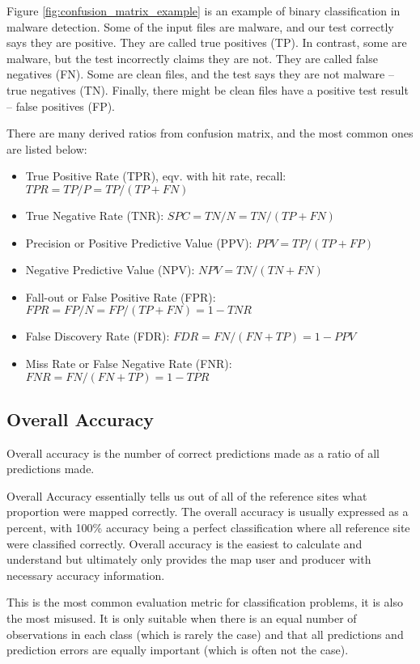 Figure \ref{fig:confusion_matrix_example} is an example of binary classification in malware detection. Some of the input files are malware, and our test correctly says they are positive. They are called true positives (TP). In contrast, some are malware, but the test incorrectly claims they are not. They are called false negatives (FN). Some are clean files, and the test says they are not malware – true negatives (TN). Finally, there might be clean files have a positive test result – false positives (FP).

There are many derived ratios from confusion matrix, and the most common ones are listed below:

\begin{itemize}
    \item True Positive Rate (TPR), eqv. with hit rate, recall: $TPR = TP/P = TP/(TP + FN)$
    \item True Negative Rate (TNR): $SPC = TN/N = TN/(TP + FN)$
    \item Precision or Positive Predictive Value (PPV): $PPV = TP/(TP + FP)$
    \item Negative Predictive Value (NPV): $NPV = TN/(TN + FN)$
    \item Fall-out or False Positive Rate (FPR): $FPR = FP/N = FP/(TP + FN) = 1 - TNR$
    \item False Discovery Rate (FDR): $FDR = FN/(FN + TP) = 1 - PPV$
    \item Miss Rate or False Negative Rate (FNR): $FNR = FN/(FN + TP) = 1 - TPR$
\end{itemize}

\subsection{Overall Accuracy}

Overall accuracy is the number of correct predictions made as a ratio of all predictions made.

Overall Accuracy essentially tells us out of all of the reference sites what proportion were mapped correctly. The overall accuracy is usually expressed as a percent, with 100\% accuracy being a perfect classification where all reference site were classified correctly. Overall accuracy is the easiest to calculate and understand but ultimately only provides the map user and producer with necessary accuracy information.

This is the most common evaluation metric for classification problems, it is also the most misused. It is only suitable when there is an equal number of observations in each class (which is rarely the case) and that all predictions and prediction errors are equally important (which is often not the case).

